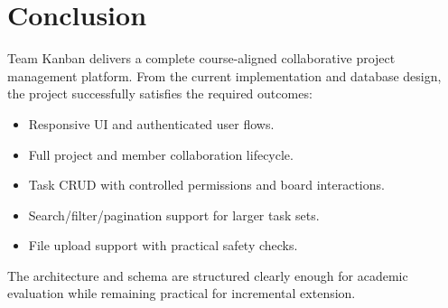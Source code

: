 \section{Conclusion}

Team Kanban delivers a complete course-aligned collaborative project management platform.
From the current implementation and database design, the project successfully satisfies the required outcomes:
\begin{itemize}
    \item Responsive UI and authenticated user flows.
    \item Full project and member collaboration lifecycle.
    \item Task CRUD with controlled permissions and board interactions.
    \item Search/filter/pagination support for larger task sets.
    \item File upload support with practical safety checks.
\end{itemize}

The architecture and schema are structured clearly enough for academic evaluation while remaining practical for incremental extension.
